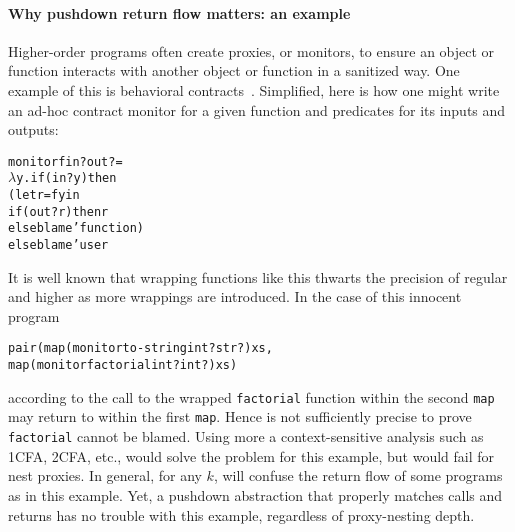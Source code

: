 \paragraph{Why pushdown return flow matters: an example}
Higher-order programs often create proxies, or monitors, to ensure an object or function interacts with another object or function in a sanitized way.
%
One example of this is behavioral contracts~\citep{dvanhorn:Findler2002Contracts}.
%
Simplified, here is how one might write an ad-hoc contract monitor for
a given function and predicates for its inputs and outputs:
\begin{alltt}
  monitor f in? out? =
  \(\lambda\) y. if (in? y) then
        (let r = f y in 
         if (out? r) then r
         else blame 'function)
       else blame 'user
\end{alltt}

It is well known that wrapping functions like this thwarts the
precision of regular \zcfa{} and higher \kcfa{} as more wrappings are
introduced.
%
In the case of this innocent program
\begin{alltt}
  pair(map (monitor to-string int? str?) xs,
       map (monitor factorial int? int?) xs)
\end{alltt}

according to \zcfa{} the call to the wrapped \texttt{factorial}
function within the second \texttt{map} may return to within the
first \texttt{map}.  Hence \zcfa{} is not sufficiently precise to 
prove \texttt{factorial} cannot be blamed.
%
Using more a context-sensitive analysis such as 1CFA, 2CFA, etc.,
would solve the problem for this example, but would fail for nest
proxies.
%
In general, for any $k$, \kcfa{} will confuse the return flow of some
programs as in this example.
%
Yet, a pushdown abstraction that properly matches calls and returns
has no trouble with this example, regardless of proxy-nesting depth.


%


